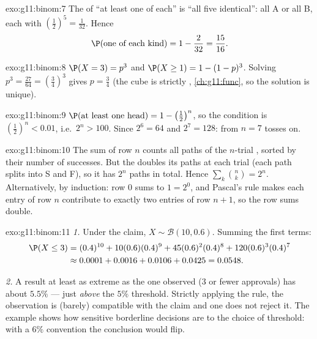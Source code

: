\begin{solution}{exo:g11:binom:7}
The  of ``at least one of each'' is ``all five identical'':
all A or all B, each with  $\left(\frac12\right)^5 =
\frac1{32}$. Hence
\[
\P(\text{one of each kind}) = 1 - \frac{2}{32} = \frac{15}{16} .
\]
\end{solution}

\begin{solution}{exo:g11:binom:8}
$\P(X = 3) = p^3$ and $\P(X \geq 1) = 1 - (1-p)^3$. Solving
$p^3 = \frac{27}{64} = \left(\frac34\right)^3$ gives $p = \frac34$ (the
cube  is strictly , \cref{ch:g11:func}, so the solution
is unique).
\end{solution}

\begin{solution}{exo:g11:binom:9}
$\P(\text{at least one head}) = 1 - \left(\frac12\right)^n$, so the
condition is $\left(\frac12\right)^n < 0.01$, i.e.\ $2^n > 100$. Since
$2^6 = 64$ and $2^7 = 128$: from $n = 7$ tosses on.
\end{solution}

\begin{solution}{exo:g11:binom:10}
The sum of row $n$ counts all paths of the $n$-trial , sorted by
their number of successes. But the  doubles its paths at each trial
(each path splits into S and F), so it has $2^n$ paths in total. Hence
$\sum_{k} \binom nk = 2^n$. Alternatively, by induction: row $0$ sums to
$1 = 2^0$, and Pascal's rule makes each entry of row $n$ contribute to
exactly two entries of row $n+1$, so the row sums double.
\end{solution}

\begin{solution}{exo:g11:binom:11}
\emph{1.} Under the claim, $X \sim \mathcal B(10, 0.6)$. Summing the
first terms:
\begin{align*}
\P(X \leq 3)
&= (0.4)^{10} + 10(0.6)(0.4)^9 + 45(0.6)^2(0.4)^8
+ 120(0.6)^3(0.4)^7\\
&\approx 0.0001 + 0.0016 + 0.0106 + 0.0425 = 0.0548 .
\end{align*}

\emph{2.} A result at least as extreme as the one observed ($3$ or fewer
approvals) has  about $5.5\%$ --- just \emph{above} the $5\%$
threshold. Strictly applying the rule, the observation is (barely)
compatible with the claim and one does not reject it. The example shows
how sensitive borderline decisions are to the choice of threshold: with a
$6\%$ convention the conclusion would flip.
\end{solution}

